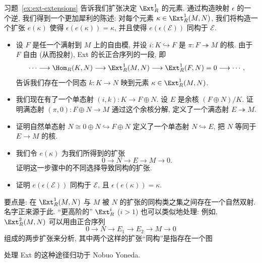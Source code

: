 \begin{prob}\label{ex:yoneda-ext}
习题~\ref{ex:ext-extensions} 告诉我们扩张决定 $\Ext_R^1$ 的元素. 通过构造映射 $\epsilon$ 的一个逆, 我们得到一个更加犀利的陈述: 对每个元素 $\kappa\in\Ext_R^1(M,N)$, 我们将构造一个扩张 $e(\kappa)$ 使得 $\epsilon(e(\kappa))=\kappa$, 并且使得 $e(\epsilon(\mathcal{E}))$ 同构于 $\mathcal{E}$.
\begin{itemize}
\item 设 $F$ 是任一个满射到 $M$ 上的自由模, 并设 $i:K\hookrightarrow F$ 是 $\pi:F\twoheadrightarrow M$ 的核. 由于 $F$ 自由 (从而投射), Ext 的长正合序列的一段, 即
\[
\cdots\longrightarrow\Hom_R(K,N)\longrightarrow\Ext_R^1(M,N)\longrightarrow\Ext_R^1(F,N)=0\longrightarrow\cdots,
\]
告诉我们存在一个同态 $k:K\to N$ 映到元素 $\kappa\in\Ext_R^1(M,N)$.
\item 我们现在有了一个单态射 $(i,k):K\to F\oplus N$. 设 $E$ 是余核 $(F\oplus N)/K$. 证明满态射 $(\pi,0):F\oplus N\to M$ 通过这个余核分解, 定义了一个满态射 $E\twoheadrightarrow M$.
\item 证明自然单态射 $N\cong 0\oplus N\hookrightarrow F\oplus N$ 定义了一个单态射 $N\hookrightarrow E$, 把 $N$ 等同于 $E\to M$ 的核.
\item 我们令 $e(\kappa)$ 为我们所得到的扩张
\[
0\longrightarrow N\longrightarrow E\longrightarrow M\longrightarrow 0.
\]
证明这一步骤中的不同选择导致同构的扩张.
\item 证明 $e(\epsilon(\mathcal{E}))$ 同构于 $\mathcal{E}$, 且 $\epsilon(e(\kappa))=\kappa$.
\end{itemize}
要点是: 在 $\Ext_R^1(M,N)$ 与 $M$ 被 $N$ 的扩张的同构类之集之间存在一个自然双射. 名字正来源于此. ``更高阶的'' $\Ext_R^i$ ($i>1$) 也可以类似地处理: 例如, $\Ext_R^2(M,N)$ 可以用由正合序列
\[
0\longrightarrow N\longrightarrow E_1\longrightarrow E_2\longrightarrow M\longrightarrow 0
\]
组成的两步扩张来分析, 其中两个这样的扩张``同构''是指存在一个图
\begin{center}
\end{center}
处理 Ext 的这种途径归功于 Nobuo Yoneda.
\end{prob}
